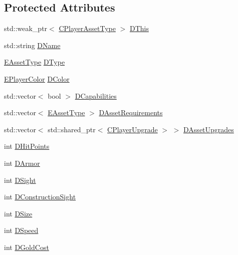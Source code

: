 \subsection*{Protected Attributes}
\begin{DoxyCompactItemize}
\item 
std\+::weak\+\_\+ptr$<$ \hyperlink{classCPlayerAssetType}{C\+Player\+Asset\+Type} $>$ \hyperlink{classCPlayerAssetType_ae0d263de96ccad929d79d6b46f7b8deb}{D\+This}
\item 
std\+::string \hyperlink{classCPlayerAssetType_a95b557ce33af1aaecb26e8d78b0e2706}{D\+Name}
\item 
\hyperlink{GameDataTypes_8h_a5600d4fc433b83300308921974477fec}{E\+Asset\+Type} \hyperlink{classCPlayerAssetType_a2a52bda918a79ecf5582314ef1f61c8a}{D\+Type}
\item 
\hyperlink{GameDataTypes_8h_aafb0ca75933357ff28a6d7efbdd7602f}{E\+Player\+Color} \hyperlink{classCPlayerAssetType_abd32b27281bcf17a611802aef148462b}{D\+Color}
\item 
std\+::vector$<$ bool $>$ \hyperlink{classCPlayerAssetType_a243f9161c56446b378dc42b51977fc58}{D\+Capabilities}
\item 
std\+::vector$<$ \hyperlink{GameDataTypes_8h_a5600d4fc433b83300308921974477fec}{E\+Asset\+Type} $>$ \hyperlink{classCPlayerAssetType_a76d89bd6479ac30a0452d0a8aaf731c5}{D\+Asset\+Requirements}
\item 
std\+::vector$<$ std\+::shared\+\_\+ptr$<$ \hyperlink{classCPlayerUpgrade}{C\+Player\+Upgrade} $>$ $>$ \hyperlink{classCPlayerAssetType_aeb8d5c3ea81ea56248d02a5e24d48001}{D\+Asset\+Upgrades}
\item 
int \hyperlink{classCPlayerAssetType_a0f10bff263838914bf347d9e9bf0af68}{D\+Hit\+Points}
\item 
int \hyperlink{classCPlayerAssetType_ac211254f807a497099509a3e96f7185a}{D\+Armor}
\item 
int \hyperlink{classCPlayerAssetType_afa32c3f45737443299a4e681dfe64911}{D\+Sight}
\item 
int \hyperlink{classCPlayerAssetType_a71b34081d4540087472af3cb9052e04a}{D\+Construction\+Sight}
\item 
int \hyperlink{classCPlayerAssetType_a00e59fe19f83fe37f23341c05010dbc2}{D\+Size}
\item 
int \hyperlink{classCPlayerAssetType_a0e72be67119e97fb64a6036cd5da8d1a}{D\+Speed}
\item 
int \hyperlink{classCPlayerAssetType_a2153f3ed158144fc517efd2866de0017}{D\+Gold\+Cost}
\item 

\end{DoxyCompactItemize}
